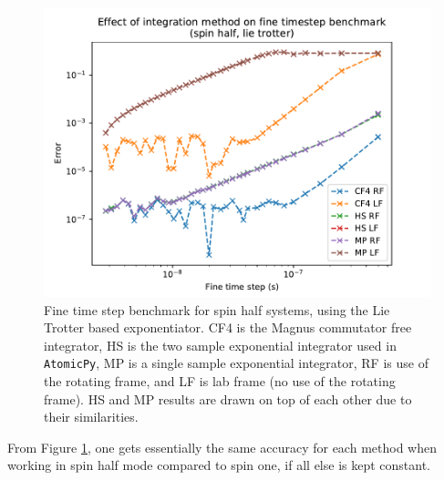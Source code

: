 \documentclass{jors}
\begin{document}
			\begin{figure}[h!]
				\includegraphics[scale=0.9]{benchmark_comparison_spin_half_lt_publication.pdf}
				\caption{Fine time step benchmark for spin half systems, using the Lie Trotter based exponentiator. CF4 is the Magnus commutator free integrator, HS is the two sample exponential integrator used in \texttt{AtomicPy}, MP is a single sample exponential integrator, RF is use of the rotating frame, and LF is lab frame (no use of the rotating frame). HS and MP results are drawn on top of each other due to their similarities.}
				\label{fig:benchmark_comparison_spin_half_lt}
			\end{figure}

			From Figure \ref{fig:benchmark_comparison_spin_half_lt}, one gets essentially the same accuracy for each method when working in spin half mode compared to spin one, if all else is kept constant.
\end{document}
